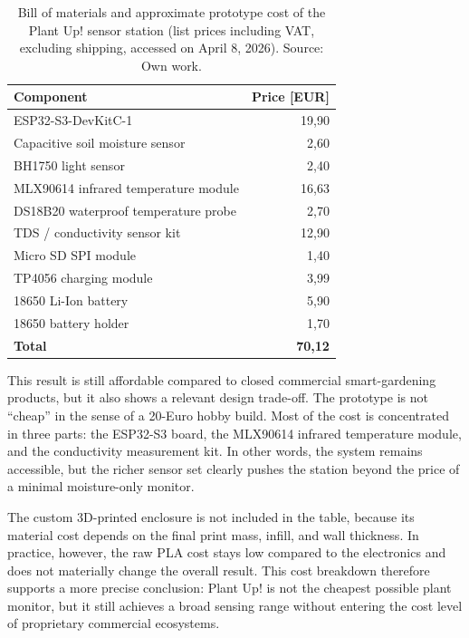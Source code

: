 \begin{table}[htbp]
\centering
\begin{tabular}{l r}
\toprule
\textbf{Component} & \textbf{Price [EUR]} \\
\midrule
ESP32-S3-DevKitC-1 \cite{costEsp32S3DevKit} & 19,90 \\
Capacitive soil moisture sensor \cite{costCapacitiveMoisture} & 2,60 \\
BH1750 light sensor \cite{costBh1750} & 2,40 \\
MLX90614 infrared temperature module \cite{costMlx90614} & 16,63 \\
DS18B20 waterproof temperature probe \cite{costDs18b20} & 2,70 \\
TDS / conductivity sensor kit \cite{costTdsSensor} & 12,90 \\
Micro SD SPI module \cite{costMicroSdModule} & 1,40 \\
TP4056 charging module \cite{costTp4056} & 3,99 \\
18650 Li-Ion battery \cite{cost18650Battery} & 5,90 \\
18650 battery holder \cite{cost18650Holder} & 1,70 \\
\midrule
\textbf{Total} & \textbf{70,12} \\
\bottomrule
\end{tabular}
\caption{Bill of materials and approximate prototype cost of the Plant Up! sensor station (list prices including VAT, excluding shipping, accessed on April 8, 2026). Source: Own work.}
\label{tab:bom_costs}
\end{table}

This result is still affordable compared to closed commercial smart-gardening products, but it also shows a relevant design trade-off. The prototype is not ``cheap'' in the sense of a 20-Euro hobby build. Most of the cost is concentrated in three parts: the ESP32-S3 board, the MLX90614 infrared temperature module, and the conductivity measurement kit. In other words, the system remains accessible, but the richer sensor set clearly pushes the station beyond the price of a minimal moisture-only monitor.

The custom 3D-printed enclosure is not included in the table, because its material cost depends on the final print mass, infill, and wall thickness. In practice, however, the raw PLA cost stays low compared to the electronics and does not materially change the overall result. This cost breakdown therefore supports a more precise conclusion: Plant Up! is not the cheapest possible plant monitor, but it still achieves a broad sensing range without entering the cost level of proprietary commercial ecosystems.

